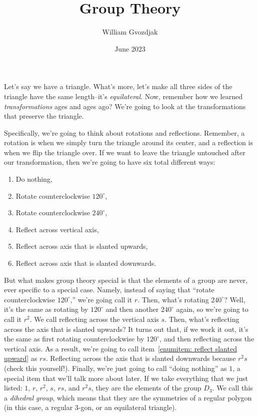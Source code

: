 \documentclass{article}
\title{Group Theory}
\author{William Gvozdjak}
\date{June 2023}
\begin{document}
\maketitle

Let's say we have a triangle. What's more, let's make all three sides of the triangle have the same length--it's \emph{equilateral}. Now, remember how we learned \emph{transformations} ages and ages ago? We're going to look at the transformations that preserve the triangle.

Specifically, we're going to think about rotations and reflections. Remember, a rotation is when we simply turn the triangle around its center, and a reflection is when we flip the triangle over. If we want to leave the triangle untouched after our transformation, then we're going to have six total different ways:
\begin{enumerate}
    \item Do nothing,
    \item Rotate counterclockwise $120^\circ$,
    \item Rotate counterclockwise $240^\circ$,
    \item Reflect across vertical axis,
    \item Reflect across axis that is slanted upwards\label{enumitem: reflect slanted upward},
    \item Reflect across axis that is slanted downwards.
\end{enumerate}

But what makes group theory special is that the elements of a group are never, ever specific to a special case. Namely, instead of saying that ``rotate counterclockwise $120^\circ$,'' we're going call it $r$. Then, what's rotating $240^\circ$? Well, it's the same as rotating by $120^\circ$ and then another $240^\circ$ again, so we're going to call it $r^2$. We call reflecting across the vertical axis $s$. Then, what's reflecting across the axis that is slanted upwards? It turns out that, if we work it out, it's the same as first rotating counterclockwise by $120^\circ$, and then reflecting across the vertical axis. As a result, we're going to call item~\ref{enumitem: reflect slanted upward} as $rs$. Reflecting across the axis that is slanted downwards because $r^2s$ (check this yourself!). Finally, we're just going to call ``doing nothing'' as $1$, a special item that we'll talk more about later. If we take everything that we just listed: $1$, $r$, $r^2$, $s$, $rs$, and $r^2s$, they are the elements of the group $D_3$. We call this a \emph{dihedral group}, which means that they are the symmetries of a regular polygon (in this case, a regular $3$-gon, or an equilateral triangle).
\end{document}

